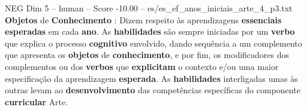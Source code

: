 \begin{textsample}{NEG Dim 5 – human – Score -10.00 – es/es\_ef\_anos\_iniciais\_arte\_4\_p3.txt}  \label{ex:f5_neg_003}
\textbf{Objetos} de \textbf{Conhecimento} : Dizem respeito às aprendizagens \textbf{essenciais} \textbf{esperadas} em cada \textbf{ano}.
As \textbf{habilidades} são sempre iniciadas por um \textbf{verbo} que explica o processo \textbf{cognitivo} envolvido, dando sequência a um complemento que apresenta os \textbf{objetos} de \textbf{conhecimento}, e por fim, os modificadores dos complementos ou dos \textbf{verbos} que \textbf{explicitam} o contexto e/ou uma maior especificação da aprendizagem \textbf{esperada}.
As \textbf{habilidades} interligadas umas às outras levam ao \textbf{desenvolvimento} das competências específicas do componente \textbf{curricular} Arte.

\end{textsample}
